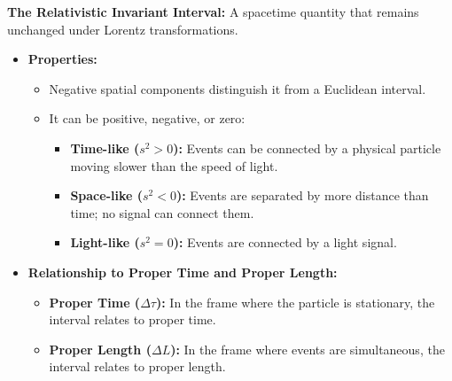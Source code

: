 \documentclass{article}
\newcommand{\conceptbox}[1]{\begin{tcolorbox}[colback=blue!10] #1 \end{tcolorbox}}
\begin{document}
\conceptbox{
\textbf{The Relativistic Invariant Interval:} 
A spacetime quantity that remains unchanged under Lorentz transformations.

\begin{itemize}
    \item \textbf{Properties:}
    \begin{itemize}
        \item Negative spatial components distinguish it from a Euclidean interval.
        \item It can be positive, negative, or zero:
        \begin{itemize}
            \item \textbf{Time-like ($s^2 > 0$):} Events can be connected by a physical particle moving slower than the speed of light.
            \item \textbf{Space-like ($s^2 < 0$):} Events are separated by more distance than time; no signal can connect them.
            \item \textbf{Light-like ($s^2 = 0$):} Events are connected by a light signal.
        \end{itemize}
    \end{itemize}
    \item \textbf{Relationship to Proper Time and Proper Length:}
    \begin{itemize}
        \item \textbf{Proper Time ($\Delta \tau$):} In the frame where the particle is stationary, the interval relates to proper time.
        \item \textbf{Proper Length ($\Delta L$):} In the frame where events are simultaneous, the interval relates to proper length.
    \end{itemize}
\end{itemize}
}
\end{document}
